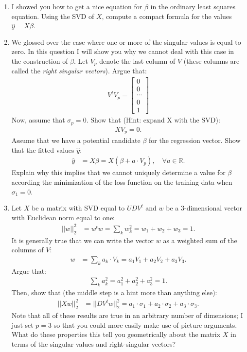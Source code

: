\documentclass[12pt,hidelinks]{article}
\numberwithin{equation}{section}
\begin{document}
\begin{enumerate}
\item I showed you how to get a nice equation for $\beta$ in the ordinary
least squares equation. Using the SVD of $X$, compute a compact formula for
the values $\widehat{y} = X \beta$.
\item We glossed over the case where one or more of the singular values is equal
to zero. In this question I will show you why we cannot deal with this case
in the construction of $\beta$. Let $V_p$ denote the last column of $V$ (these
columns are called the \textit{right singular vectors}). Argue that:
\begin{align}
V^t V_p = \begin{bmatrix} 0 \\ 0 \\ \cdots \\ 0 \\ 1 \end{bmatrix}
\end{align}
Now, assume that $\sigma_p = 0$. Show that (Hint: expand X with the SVD):
\begin{align}
XV_p = 0.
\end{align}
Assume that we have a potential candidate $\beta$ for the regression vector.
Show that the fitted values $\widehat{y}$:
\begin{align}
\widehat{y} &= X \beta = X (\beta + a \cdot V_p), \quad \forall a \in \mathbb{R}.
\end{align}
Explain why this implies that we cannot uniquely determine a value for $\beta$
according the minimization of the loss function on the training data when
$\sigma_1 = 0$.
\item Let $X$ be a matrix with SVD equal to $UDV^t$ and $w$ be a
$3$-dimensional vector with Euclidean norm equal to one:
\begin{align}
|| w ||_2^2 &= w^t w = \sum_k w_k^2 = w_1 + w_2 + w_3 = 1.
\end{align}
It is generally true that we can write the vector $w$ as a weighted sum of
the columns of $V$:
\begin{align}
w &= \sum_k a_k \cdot V_k = a_1 V_1 + a_2 V_2 + a_3 V_3.
\end{align}
Argue that:
\begin{align}
\sum_k a_k^2 = a_1^2 + a_2^2 + a_3^2 = 1.
\end{align}
Then, show that (the middle step is a hint more than anything else):
\begin{align}
|| X w ||_2^2 &= || D V^t w ||_2^2 = a_1 \cdot \sigma_1 + a_2 \cdot \sigma_2 + a_3 \cdot \sigma_3 .
\end{align}
Note that all of these results are true in an arbitrary number of dimensions;
I just set $p=3$ so that you could more easily make use of picture arguments.
What do these properties this tell you geometrically about the matrix $X$ in
terms of the singular values and right-singular vectors?


\end{enumerate}
\end{document}
